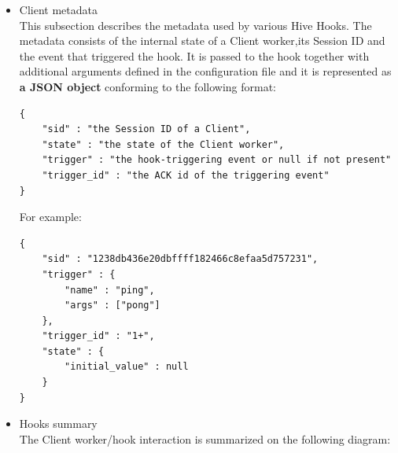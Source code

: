 \documentclass[a4paper]{article}
\begin{document}
\begin{itemize}
\item Client metadata\\
\label{sec-7-1-4-2}%
This subsection describes the metadata used by various Hive Hooks. The metadata consists of the internal state of a Client worker,its Session ID and the event that triggered the hook. It is passed to the hook together with additional arguments defined in the configuration file and it is represented as \textbf{a JSON object} conforming to the following format:


\begin{verbatim}
{
    "sid" : "the Session ID of a Client",
    "state" : "the state of the Client worker",
    "trigger" : "the hook-triggering event or null if not present"
    "trigger_id" : "the ACK id of the triggering event"
}
\end{verbatim}




\noindent
For example:


\begin{verbatim}
{
    "sid" : "1238db436e20dbffff182466c8efaa5d757231",
    "trigger" : {
        "name" : "ping",
        "args" : ["pong"]
    },
    "trigger_id" : "1+",
    "state" : {
        "initial_value" : null
    }
}
\end{verbatim}





\item Hooks summary\\
\label{sec-7-1-4-3}%
The Client worker/hook interaction is summarized on the following diagram:


\end{itemize}
\end{document}
